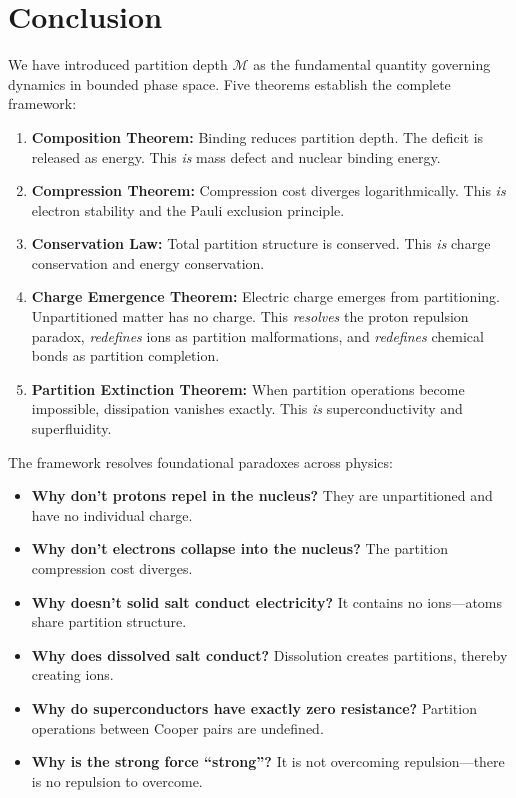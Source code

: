 \documentclass[twocolumn,10pt,a4paper]{article}
\theoremstyle{definition}
\theoremstyle{remark}
\newcommand{\Depth}{\mathcal{M}}
\begin{document}
\section{Conclusion}
\label{sec:conclusion}

We have introduced partition depth $\Depth$ as the fundamental quantity governing dynamics in bounded phase space. Five theorems establish the complete framework:

\begin{enumerate}
    \item \textbf{Composition Theorem:} Binding reduces partition depth. The deficit is released as energy. This \emph{is} mass defect and nuclear binding energy.

    \item \textbf{Compression Theorem:} Compression cost diverges logarithmically. This \emph{is} electron stability and the Pauli exclusion principle.

    \item \textbf{Conservation Law:} Total partition structure is conserved. This \emph{is} charge conservation and energy conservation.

    \item \textbf{Charge Emergence Theorem:} Electric charge emerges from partitioning. Unpartitioned matter has no charge. This \emph{resolves} the proton repulsion paradox, \emph{redefines} ions as partition malformations, and \emph{redefines} chemical bonds as partition completion.

    \item \textbf{Partition Extinction Theorem:} When partition operations become impossible, dissipation vanishes exactly. This \emph{is} superconductivity and superfluidity.
\end{enumerate}

The framework resolves foundational paradoxes across physics:

\begin{itemize}
    \item \textbf{Why don't protons repel in the nucleus?} They are unpartitioned and have no individual charge.
    \item \textbf{Why don't electrons collapse into the nucleus?} The partition compression cost diverges.
    \item \textbf{Why doesn't solid salt conduct electricity?} It contains no ions---atoms share partition structure.
    \item \textbf{Why does dissolved salt conduct?} Dissolution creates partitions, thereby creating ions.
    \item \textbf{Why do superconductors have exactly zero resistance?} Partition operations between Cooper pairs are undefined.
    \item \textbf{Why is the strong force ``strong''?} It is not overcoming repulsion---there is no repulsion to overcome.
\end{itemize}
\end{document}
